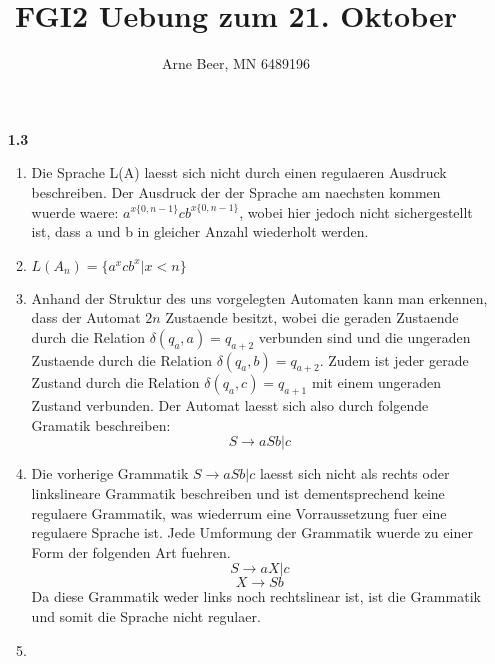 \documentclass{article}
\title{FGI2 Uebung zum 21. Oktober}
\author{Arne Beer, MN 6489196}
\begin{document}
\maketitle

\begin{enumerate}
    \item[\textbf{1.3}]
        \begin{enumerate}
            \item
                Die Sprache L(A) laesst sich nicht durch einen regulaeren Ausdruck beschreiben. Der Ausdruck der der Sprache am naechsten kommen wuerde waere: $a^{x\{0,n-1\}}c b^{x\{0,n-1\}}$, wobei hier jedoch nicht sichergestellt ist, dass a und b in gleicher Anzahl wiederholt werden.
            \item
                $L(A_n)=\{a^x c b^x| x < n\}$
            \item
                Anhand der Struktur des uns vorgelegten Automaten kann man erkennen, dass der Automat $2n$ Zustaende besitzt, wobei die geraden Zustaende durch die Relation $\delta(q_a, a) = q_{a+2}$ verbunden sind und die ungeraden Zustaende durch die Relation $\delta(q_a, b) = q_{a+2}$. Zudem ist jeder gerade Zustand durch die Relation $\delta(q_a, c) = q_{a+1}$ mit einem ungeraden Zustand verbunden. 
                Der Automat laesst sich also durch folgende Gramatik beschreiben:\\ 
                \[S \longrightarrow aSb | c\]
            \item
                Die vorherige Grammatik $S \longrightarrow aSb | c$ laesst sich nicht als rechts oder linkslineare Grammatik beschreiben und ist dementsprechend keine regulaere Grammatik, was wiederrum eine Vorraussetzung fuer eine regulaere Sprache ist. 
                Jede Umformung der Grammatik wuerde zu einer Form der folgenden Art fuehren. 
                \[S \longrightarrow aX | c\]
                \[X \longrightarrow Sb\]
                Da diese Grammatik weder links noch rechtslinear ist, ist die Grammatik und somit die Sprache nicht regulaer.
            \item


        \end{enumerate}

\newpage    


\end{enumerate}
\end{document}
